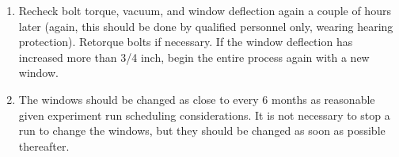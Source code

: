 \begin{enumerate}
\item{Recheck bolt torque, vacuum, and window deflection
again a couple of hours later (again, this should be done by
qualified personnel only, wearing hearing
protection). Retorque bolts if necessary.
If the window deflection has increased more than 3/4 inch, begin the entire
process again with a new window.}

\item{The windows should be changed as close to every 6 months as
reasonable given experiment run scheduling considerations. It is not
necessary to stop a run to change the windows, but they should be changed
as soon as possible thereafter.}

\end{enumerate}


